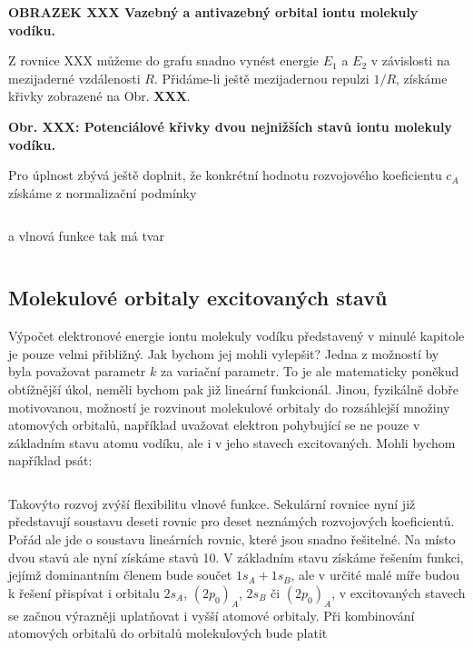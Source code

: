 \bigskip

\textbf{OBRAZEK XXX Vazebný a antivazebný orbital iontu molekuly vodíku.} 

\bigskip

\noindent Z rovnice XXX můžeme do grafu snadno vynést energie $E_1$ a $E_2$ v závislosti na mezijaderné vzdálenosti $R$. Přidáme-li ještě mezijadernou repulzi $1/R$, získáme křivky zobrazené na Obr. \textbf{XXX}.

\bigskip

\textbf{Obr. XXX: Potenciálové křivky dvou nejnižších stavů iontu molekuly vodíku.} 

\bigskip


Pro úplnost zbývá ještě doplnit, že konkrétní hodnotu rozvojového koeficientu $c_A$ získáme z normalizační podmínky


\begin{equation}
\label{rov:XXX}
\end{equation}


\noindent a vlnová funkce tak má tvar


\begin{equation}
\label{rov:XXX}
\end{equation}

\subsection{Molekulové orbitaly excitovaných stavů}

Výpočet elektronové energie iontu molekuly vodíku představený v minulé kapitole je pouze velmi přibližný. Jak bychom jej mohli vylepšit? Jedna z možností by byla považovat parametr $k$ za variační parametr. To je ale matematicky poněkud obtížnější úkol, neměli bychom pak již lineární funkcionál. Jinou, fyzikálně dobře motivovanou, možností je rozvinout molekulové orbitaly do rozsáhlejší množiny atomových orbitalů, například uvažovat elektron pohybující se ne pouze v základním stavu atomu vodíku, ale i v jeho stavech excitovaných. Mohli bychom například psát:

\begin{equation}
\label{rov:XXX}
\end{equation}

\noindent Takovýto rozvoj zvýší flexibilitu vlnové funkce. Sekulární rovnice nyní již představují soustavu deseti rovnic pro deset neznámých rozvojových koeficientů. Pořád ale jde o soustavu lineárních rovnic, které jsou snadno řešitelné. Na místo dvou stavů ale nyní získáme stavů 10. V základním stavu získáme řešením funkci, jejímž dominantním členem bude součet $1s_A+1s_B$, ale v určité malé míře budou k řešení přispívat i orbitalu $2s_A$, $(2p_0)_A$, $2s_B$ či $(2p_0)_A$, v excitovaných stavech se začnou výrazněji uplatňovat i vyšší atomové orbitaly. Při kombinování atomových orbitalů do orbitalů molekulových bude platit

